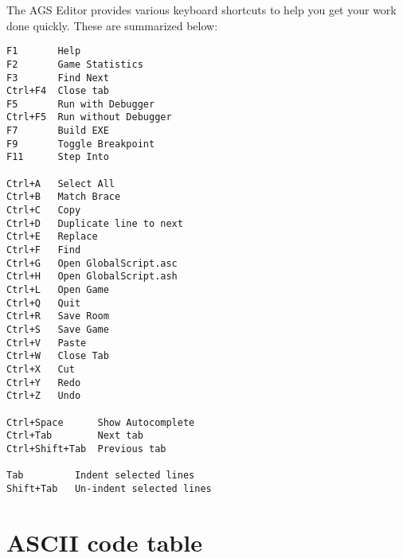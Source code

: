 The AGS Editor provides various keyboard shortcuts to help you get your work done quickly.
These are summarized below:

\begin{verbatim}
F1       Help
F2       Game Statistics
F3       Find Next
Ctrl+F4  Close tab
F5       Run with Debugger
Ctrl+F5  Run without Debugger
F7       Build EXE
F9       Toggle Breakpoint
F11      Step Into

Ctrl+A   Select All
Ctrl+B   Match Brace
Ctrl+C   Copy
Ctrl+D   Duplicate line to next
Ctrl+E   Replace
Ctrl+F   Find
Ctrl+G   Open GlobalScript.asc
Ctrl+H   Open GlobalScript.ash
Ctrl+L   Open Game
Ctrl+Q   Quit
Ctrl+R   Save Room
Ctrl+S   Save Game
Ctrl+V   Paste
Ctrl+W   Close Tab
Ctrl+X   Cut
Ctrl+Y   Redo
Ctrl+Z   Undo

Ctrl+Space      Show Autocomplete
Ctrl+Tab        Next tab
Ctrl+Shift+Tab  Previous tab

Tab         Indent selected lines
Shift+Tab   Un-indent selected lines
\end{verbatim}

\section{ASCII code table}\label{ASCIIcodes}%

